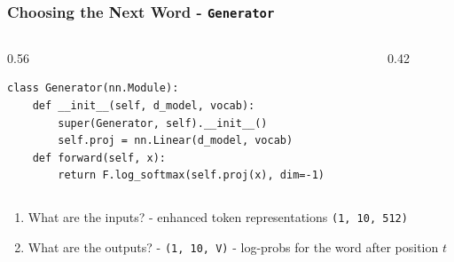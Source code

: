 \documentclass{beamer}
\newcommand{\shape}[1]{\texttt{(#1)}}
\begin{document}
\begin{frame}[fragile]
  \frametitle{Choosing the Next Word - \texttt{Generator}}
  \begin{columns}[c]
    \begin{column}{0.56\textwidth}
\begin{lstlisting}[basicstyle=\ttfamily\tiny]
class Generator(nn.Module):
    def __init__(self, d_model, vocab):
        super(Generator, self).__init__()
        self.proj = nn.Linear(d_model, vocab)
    def forward(self, x):
        return F.log_softmax(self.proj(x), dim=-1)
\end{lstlisting}
    \end{column}
    \begin{column}{0.42\textwidth}
      \centering
    \end{column}
  \end{columns}
  \vfill
  \begin{enumerate}
    \item<2-> What are the inputs? - enhanced token representations \shape{1, 10, 512}
    \item<3-> What are the outputs? - \shape{1, 10, V} - log-probs for the word after position $t$
  \end{enumerate}
\end{frame}
\end{document}
